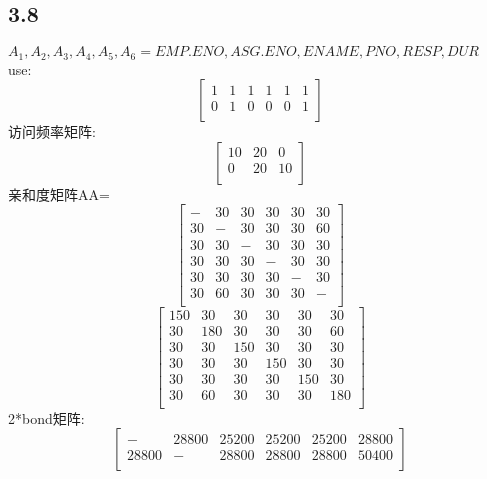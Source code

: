 \documentclass{article}
\begin{document}
\begin{CJK}{UTF8}{gbsn}
	\section*{3.8}	
	$A_1,A_2,A_3,A_4,A_5,A_6=EMP.ENO,ASG.ENO,ENAME,PNO,RESP,DUR$\\
	use:\\
	\begin{equation*}
	\begin{bmatrix}
	1&1&1&1&1&1\\
	0&1&0&0&0&1\\	
	\end{bmatrix}
	\end{equation*}
	访问频率矩阵:\\
	\begin{equation*}
	\begin{bmatrix}
	10&20&0\\
	0&20&10\\	
	\end{bmatrix}
	\end{equation*}
	亲和度矩阵AA=\\
	\begin{equation*}
	\begin{bmatrix}
	-&30&30&30&30&30\\
	30&-&30&30&30&60\\	
	30&30&-&30&30&30\\	
	30&30&30&-&30&30\\	
	30&30&30&30&-&30\\	
	30&60&30&30&30&-\\	
	\end{bmatrix}
	\end{equation*}
	\begin{equation*}
	\begin{bmatrix}
	150&30&30&30&30&30\\
	30&180&30&30&30&60\\	
	30&30&150&30&30&30\\	
	30&30&30&150&30&30\\	
	30&30&30&30&150&30\\	
	30&60&30&30&30&180\\		
	\end{bmatrix}
	\end{equation*}
	2*bond矩阵:\\
	\begin{equation*}
	\begin{bmatrix}
	-&28800&25200&25200&25200&28800\\
	28800&-&28800&28800&28800&50400\\	

\end{bmatrix}
\end{equation*}
\end{CJK}
\end{document}
